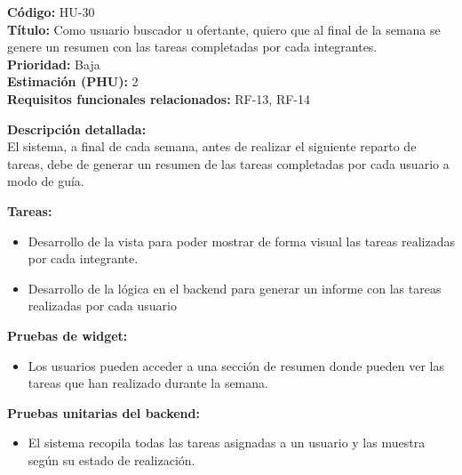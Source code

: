 \begin{tarjetaHU}
\textbf{Código:} HU-30 \\
\textbf{Título:} Como usuario buscador u ofertante, quiero que al final de la semana se genere un resumen con las tareas completadas por cada integrantes. \\
\textbf{Prioridad:} Baja \\
\textbf{Estimación (PHU):} 2 \\
\textbf{Requisitos funcionales relacionados:} RF-13, RF-14

\vspace{0.5em}
\textbf{Descripción detallada:} \\
El sistema, a final de cada semana, antes de realizar el siguiente reparto de tareas, debe de generar un resumen de las tareas completadas por cada usuario a modo de guía.

\vspace{0.5em}
\textbf{Tareas:}
\begin{itemize}[left=0pt]
  \item Desarrollo de la vista para poder mostrar de forma visual las tareas realizadas por cada integrante.
  \item Desarrollo de la lógica en el backend para generar un informe con las tareas realizadas por cada usuario
\end{itemize}

\vspace{0.5em}
\textbf{Pruebas de widget:}
\begin{itemize}[left=0pt]
  \item Los usuarios pueden acceder a una sección de resumen donde pueden ver las tareas que han realizado durante la semana.
\end{itemize}
\textbf{Pruebas unitarias del backend:}
\begin{itemize}[left=0pt]
  \item El sistema recopila todas las tareas asignadas a un usuario y las muestra según su estado de realización.
\end{itemize}
\end{tarjetaHU}

